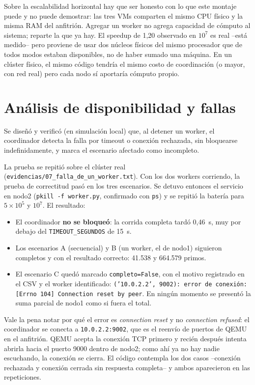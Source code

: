 \documentclass[11pt]{article}
\begin{document}
Sobre la escalabilidad horizontal hay que ser honesto con lo que este montaje
puede y no puede demostrar: las tres VMs comparten el mismo CPU físico y la
misma RAM del anfitrión. Agregar un worker no agrega capacidad de cómputo al
sistema; reparte la que ya hay. El speedup de 1,20 observado en $10^7$ es real
--está medido-- pero proviene de usar dos núcleos físicos del mismo procesador
que de todos modos estaban disponibles, no de haber sumado una máquina. En un
clúster físico, el mismo código tendría el mismo costo de coordinación (o
mayor, con red real) pero cada nodo sí aportaría cómputo propio.

\section{Análisis de disponibilidad y fallas}

Se diseñó y verificó (en simulación local) que, al detener un worker, el
coordinador detecta la falla por timeout o conexión rechazada, sin bloquearse
indefinidamente, y marca el escenario afectado como incompleto.

La prueba se repitió sobre el clúster real
(\texttt{evidencias/07\_falla\_de\_un\_worker.txt}). Con los dos workers
corriendo, la prueba de correctitud pasó en los tres escenarios. Se detuvo
entonces el servicio en nodo2 (\texttt{pkill -f worker.py}, confirmado con
\texttt{ps}) y se repitió la batería para $5\times10^5$ y $10^7$. El resultado:

\begin{itemize}
  \item El coordinador \textbf{no se bloqueó}: la corrida completa tardó
  0,46~s, muy por debajo del \texttt{TIMEOUT\_SEGUNDOS} de 15~s.
  \item Los escenarios A (secuencial) y B (un worker, el de nodo1) siguieron
  completos y con el resultado correcto: 41.538 y 664.579 primos.
  \item El escenario C quedó marcado \texttt{completo=False}, con el motivo
  registrado en el CSV y el worker identificado:
  \texttt{('10.0.2.2', 9002): error de conexión: [Errno 104] Connection reset by peer}.
  En ningún momento se presentó la suma parcial de nodo1 como si fuera el total.
\end{itemize}

Vale la pena notar por qué el error es \emph{connection reset} y no
\emph{connection refused}: el coordinador se conecta a \texttt{10.0.2.2:9002},
que es el reenvío de puertos de QEMU en el anfitrión. QEMU acepta la conexión
TCP primero y recién después intenta abrirla hacia el puerto 9000 dentro de
nodo2; como ahí ya no hay nadie escuchando, la conexión se cierra. El código
contempla los dos casos --conexión rechazada y conexión cerrada sin respuesta
completa-- y ambos aparecieron en las repeticiones.
\end{document}
